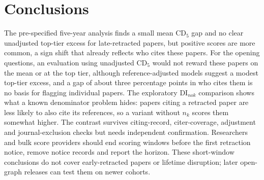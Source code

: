 \section{Conclusions}\label{sec:conclusions}

The pre-specified five-year analysis finds a small mean CD$_5$ gap and no clear unadjusted top-tier excess for late-retracted
papers, but positive scores are more common, a sign shift that already reflects who cites these papers.
For the opening questions, an evaluation using unadjusted CD$_5$ would not reward these papers on the mean or at the
top tier, although reference-adjusted models suggest a modest top-tier excess, and a gap of about three percentage
points in who cites them is no basis for flagging individual papers.
The exploratory DI$_{nok}$ comparison shows what a known denominator problem hides: papers citing a retracted paper
are less likely to also cite its references, so a variant without $n_k$ scores them somewhat higher. The contrast
survives citing-record, citer-coverage, adjustment and journal-exclusion checks but needs independent confirmation.
Researchers and bulk score providers should end scoring windows before the first retraction notice,
remove notice records and report the horizon. These short-window conclusions do not cover early-retracted papers
or lifetime disruption; later open-graph releases can test them on newer cohorts.
